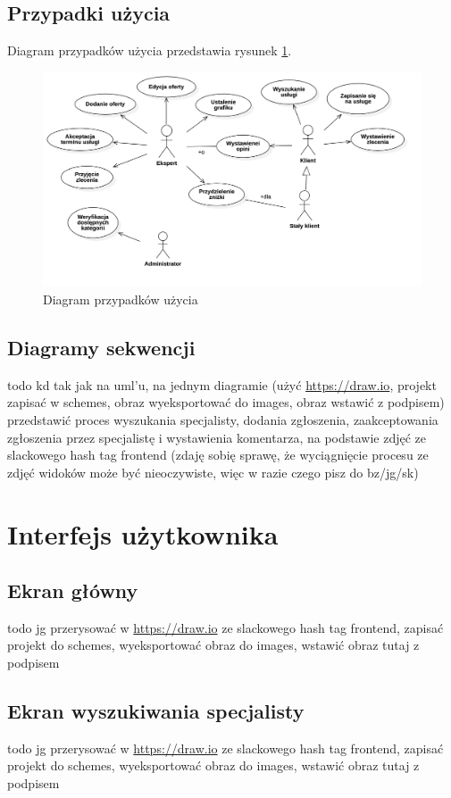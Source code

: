 \documentclass{article}
\begin{document}
  \subsection{Przypadki użycia}
  Diagram przypadków użycia przedstawia rysunek \ref{fig:ucDiagram}.

  \begin{figure}[h]
	  \centering
	  \includegraphics[width=0.8\textwidth{}]{use_case_diagram.png}
	  \caption{Diagram przypadków użycia}
	  \label{fig:ucDiagram}
  \end{figure}
  
  \subsection{Diagramy sekwencji}
	todo kd tak jak na uml'u, na jednym diagramie (użyć \url{https://draw.io}, projekt zapisać w schemes, obraz wyeksportować do images, obraz wstawić z podpisem) przedstawić proces wyszukania specjalisty, dodania zgłoszenia, zaakceptowania zgłoszenia przez specjalistę i wystawienia komentarza, na podstawie zdjęć ze slackowego hash tag frontend (zdaję sobię sprawę, że wyciągnięcie procesu ze zdjęć widoków może być nieoczywiste, więc w razie czego pisz do bz/jg/sk)
  
	\section{Interfejs użytkownika}
  
	\subsection{Ekran główny}
	todo jg przerysować w \url{https://draw.io} ze slackowego hash tag frontend, zapisać projekt do schemes, wyeksportować obraz do images, wstawić obraz tutaj z podpisem
	
	\subsection{Ekran wyszukiwania specjalisty}
	todo jg przerysować w \url{https://draw.io} ze slackowego hash tag frontend, zapisać projekt do schemes, wyeksportować obraz do images, wstawić obraz tutaj z podpisem
	
\end{document}
